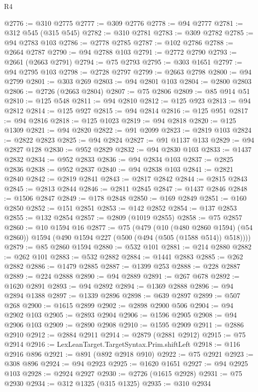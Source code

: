 \begin{lexlean}{R4}
\begin{coremodule}
@2776 := @310 @2775
@2777 := @309 @2776
@2778 := @94 @2777
@2781 := @312 @545 (@315 @545)
@2782 := @310 @2781
@2783 := @309 @2782
@2785 := @94 @2783 @103
@2786 := @2778 @2785
@2787 := @102 @2786
@2788 := @2664 @2787
@2790 := @94 @2788 @103
@2791 := @2772 @2790
@2793 := @2661 (@2663 @2791)
@2794 := @75 @2793
@2795 := @303 @1651
@2797 := @94 @2795 @103
@2798 := @2728 @2797
@2799 := @2663 @2798
@2800 := @94 @2799
@2801 := @303 @269
@2803 := @94 @2801 @103
@2804 := @2800 @2803
@2806 := @2726 (@2663 @2804)
@2807 := @75 @2806
@2809 := @85 @914 @51
@2810 := @125 @548
@2811 := @94 @2810
@2812 := @125 @923
@2813 := @94 @2812
@2814 := @125 @927
@2815 := @94 @2814
@2816 := @125 @951
@2817 := @94 @2816
@2818 := @125 @1023
@2819 := @94 @2818
@2820 := @125 @1309
@2821 := @94 @2820
@2822 := @91 @2099
@2823 := @2819 @103
@2824 := @2822 @2823
@2825 := @94 @2824
@2827 := @91 @1137 @133
@2829 := @94 @2827 @128
@2830 := @952 @2829
@2832 := @94 @2830 @103
@2833 := @1437 @2832
@2834 := @952 @2833
@2836 := @94 @2834 @103
@2837 := @2825 @2836
@2838 := @952 @2837
@2840 := @94 @2838 @103
@2841 := @2821 @2840
@2842 := @2819 @2841
@2843 := @2817 @2842
@2844 := @2815 @2843
@2845 := @2813 @2844
@2846 := @2811 @2845
@2847 := @1437 @2846
@2848 := @1506 @2847
@2849 := @178 @2848
@2850 := @169 @2849
@2851 := @160 @2850
@2852 := @151 @2851
@2853 := @142 @2852
@2854 := @137 @2853
@2855 := @132 @2854
@2857 := @2809 (@1019 @2855)
@2858 := @75 @2857
@2860 := @10 @1594 @16
@2877 := @75
    (@479
      (@10 (@480 @2860 @1594) (@54 @2860))
      @1594
      (@490 @1594 @227 (@500 (@494 (@505 (@1588 @514)) @518))))
@2879 := @85 @2860 @1594
@2880 := @532 @101
@2881 := @214 @2880
@2882 := @262 @101
@2883 := @532 @2882
@2884 := @1441 @2883
@2885 := @262 @2882
@2886 := @1479 @2885
@2887 := @1399 @253
@2888 := @228 @2887
@2889 := @224 @2888
@2890 := @94 @2889
@2891 := @267 @678
@2892 := @1620 @2891
@2893 := @94 @2892
@2894 := @1369 @2888
@2896 := @94 @2894 @1388
@2897 := @1339 @2896
@2898 := @639 @2897
@2899 := @507 @268
@2900 := @1615 @2899
@2902 := @2898 @2900 @506
@2904 := @94 @2902 @103
@2905 := @2893 @2904
@2906 := @1596 @2905
@2908 := @94 @2906 @103
@2909 := @2890 @2908
@2910 := @1595 @2909
@2911 := @2886 @2910
@2912 := @2884 @2911
@2914 := @2879 (@2881 @2912)
@2915 := @75 @2914
@2916 := LexLeanTarget.TargetSyntax.Prim.shiftLeft
@2918 := @116 @2916 @896
@2921 := @891 (@892 @2918 @910)
@2922 := @75 @2921
@2923 := @308 @896
@2924 := @94 @2923
@2925 := @1620 @1651
@2927 := @94 @2925 @103
@2928 := @2924 @2927
@2930 := @2726 (@1615 @2928)
@2931 := @75 @2930
@2934 := @312 @1325 (@315 @1325)
@2935 := @310 @2934

\end{coremodule}
\end{lexlean}
